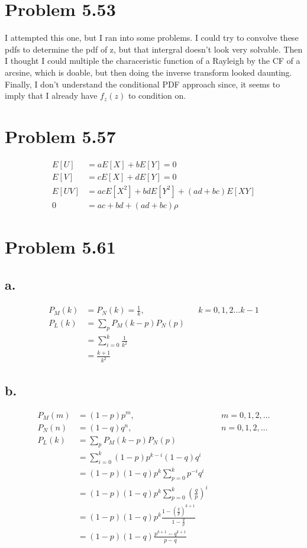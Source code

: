 \documentclass[12pt]{article}
\begin{document}
\section{Problem 5.53}
I attempted this one, but I ran into some problems. I could try to convolve these pdfs to determine the pdf of z, but that intergral
doesn't look very solvable. Then I thought I could multiple the characeristic function of a Rayleigh by the CF of a arcsine, which
is doable, but then doing the inverse transform looked daunting. Finally, I don't understand the conditional PDF approach since,
it seems to imply that I already have $f_z(z)$ to condition on. 
\section{Problem 5.57}
\begin{align*}
  E[U] &= aE[X] + bE[Y] = 0 \\
  E[V] &= cE[X] + dE[Y] = 0 \\
  E[UV] &= acE[X^2] + bdE[Y^2] + (ad+bc)E[XY] \\
  0 &= ac + bd + (ad+bc)\rho
\end{align*}

\section{Problem 5.61}
\subsection{a.}
\begin{align*}
  P_M(k) &= P_N(k) = \frac{1}{k}, & & k = 0,1,2 \dots k-1 \\
  P_L(k) &= \sum_p P_M(k-p)P_N(p) \\
  &= \sum_{i=0}^k \frac{1}{k^2} \\
  &= \frac{k+1}{k^2}
\end{align*}

\subsection{b.}
\begin{align*}
  P_M(m) &= (1-p)p^m, & &  m = 0,1,2,\dots \\
  P_N(n) &= (1-q)q^n, & &  n = 0,1,2,\dots \\
  P_L(k) &= \sum_p P_M(k-p)P_N(p) \\
  &= \sum_{i=0}^k (1-p)p^{k-i}(1-q)q^i \\
  &= (1-p)(1-q)p^k\sum_{p=0}^k p^{-i}q^i \\
  &= (1-p)(1-q)p^k\sum_{p=0}^k \left( \frac{q}{p} \right)^i \\
  &= (1-p)(1-q)p^k \frac{1-\left(\frac{q}{p}\right)^{k+1}}{1-\frac{q}{p}} \\
  &= (1-p)(1-q) \frac{p^{k+1}-q^{k+1}}{p-q}
\end{align*}
\end{document}
